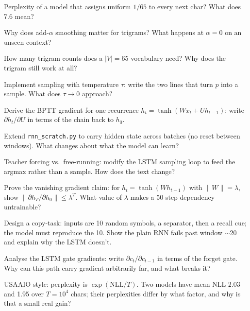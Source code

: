 \begin{exercise}[{[easy]}]
Perplexity of a model that assigns uniform $1/65$ to every next char?
What does 7.6 mean?
\end{exercise}
\begin{exercise}[{[easy]}]
Why does add-$\alpha$ smoothing matter for trigrams? What happens at
$\alpha=0$ on an unseen context?
\end{exercise}
\begin{exercise}[{[easy]}]
How many trigram counts does a $|V|=65$ vocabulary need? Why does the
trigram still work at all?
\end{exercise}
\begin{exercise}[{[medium]}]
Implement sampling with temperature $\tau$: write the two lines that
turn $p$ into a sample. What does $\tau\to0$ approach?
\end{exercise}
\begin{exercise}[{[medium]}]
Derive the BPTT gradient for one recurrence
$h_t=\tanh(Wx_t+Uh_{t-1})$: write $\partial h_t/\partial U$ in terms
of the chain back to $h_0$.
\end{exercise}
\begin{exercise}[{[medium]}]
Extend \texttt{rnn\_scratch.py} to carry hidden state across batches
(no reset between windows). What changes about what the model can
learn?
\end{exercise}
\begin{exercise}[{[medium]}]
Teacher forcing vs.\ free-running: modify the LSTM sampling loop to
feed the argmax rather than a sample. How does the text change?
\end{exercise}
\begin{exercise}[{[hard]}]
Prove the vanishing gradient claim: for
$h_t=\tanh(Wh_{t-1})$ with $\|W\|=\lambda$, show
$\|\partial h_T/\partial h_0\|\le\lambda^T$. What value of $\lambda$
makes a 50-step dependency untrainable?
\end{exercise}
\begin{exercise}[{[hard]}]
Design a copy-task: inputs are 10 random symbols, a separator, then a
recall cue; the model must reproduce the 10. Show the plain RNN fails
past window $\sim$20 and explain why the LSTM doesn't.
\end{exercise}
\begin{exercise}[{[hard]}]
Analyse the LSTM gate gradients: write $\partial c_t/\partial
c_{t-1}$ in terms of the forget gate. Why can this path carry gradient
arbitrarily far, and what breaks it?
\end{exercise}
\begin{exercise}[{[hard]}]
USAAIO-style: perplexity is $\exp(\mathrm{NLL}/T)$. Two models have
mean NLL 2.03 and 1.95 over $T=10^4$ chars; their perplexities differ
by what factor, and why is that a small real gain?
\end{exercise}


